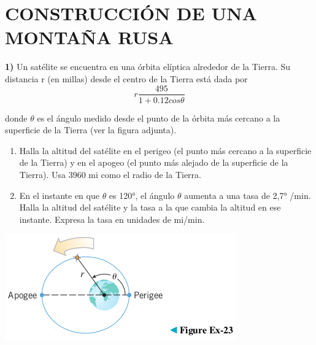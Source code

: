 \chapter*{CONSTRUCCIÓN DE UNA MONTAÑA RUSA}

\textbf{1)} Un satélite se encuentra en una órbita elíptica alrededor de la Tierra. Su distancia r (en millas) desde el centro de la Tierra está dada por$$r\frac{495}{1+0.12cos\theta}$$

donde $\theta$ es el ángulo medido desde el punto de la órbita más cercano a la superficie de la Tierra (ver la figura adjunta).
\begin{enumerate}[label=\alph*)]
    \item Halla la altitud del satélite en el perigeo (el punto más cercano a la superficie de la Tierra) y en el apogeo (el punto más alejado de la superficie de la Tierra). Usa 3960 mi como el radio de la Tierra.
    \item En el instante en que $\theta$ es 120°, el ángulo $\theta$ aumenta a una tasa de 2,7° /min. Halla la altitud del satélite y la tasa a la que cambia la altitud en ese instante. Expresa la tasa en unidades de mi/min.
\end{enumerate}

\begin{center}
    \includegraphics[height = 0.14\textheight]{recursos/image.png}\par
\end{center}